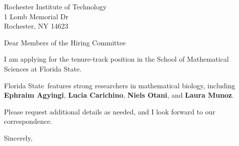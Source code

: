 




	
	
	\def\School{Florida State}
	
	\begin{letter}
		{Rochester Institute of Technology\\
			1 Lomb Memorial Dr\\
			Rochester, NY 14623
			
		}
		
		\opening{Dear Members of the Hiring Committee}
		
		
		I am applying for the tenure-track position in the School of Mathematical Sciences at \School. 
		
		
		
		\School~features strong researchers in mathematical biology, including \textbf{Ephraim Agyingi}, \textbf{Lucia Carichino}, \textbf{Niels Otani}, and \textbf{Laura Munoz}. 
		
		
		
		
		
		Please request additional details as needed, and I look forward to our correspondence.
		
		\closing{Sincerely,}
	\end{letter}
